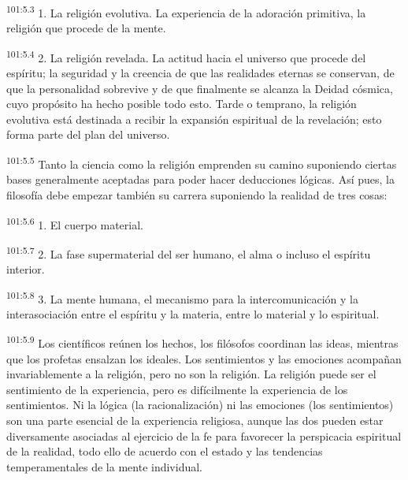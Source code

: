 \documentclass[twoside, 11pt]{book}
\begin{document}
\par
\textsuperscript{101:5.3} 1. La religión evolutiva. La experiencia de la adoración primitiva, la religión que procede de la mente.

\par
\textsuperscript{101:5.4} 2. La religión revelada. La actitud hacia el universo que procede del espíritu; la seguridad y la creencia de que las realidades eternas se conservan, de que la personalidad sobrevive y de que finalmente se alcanza la Deidad cósmica, cuyo propósito ha hecho posible todo esto. Tarde o temprano, la religión evolutiva está destinada a recibir la expansión espiritual de la revelación; esto forma parte del plan del universo.

\par
\textsuperscript{101:5.5} Tanto la ciencia como la religión emprenden su camino suponiendo ciertas bases generalmente aceptadas para poder hacer deducciones lógicas. Así pues, la filosofía debe empezar también su carrera suponiendo la realidad de tres cosas:

\par
\textsuperscript{101:5.6} 1. El cuerpo material.

\par
\textsuperscript{101:5.7} 2. La fase supermaterial del ser humano, el alma o incluso el espíritu interior.

\par
\textsuperscript{101:5.8} 3. La mente humana, el mecanismo para la intercomunicación y la interasociación entre el espíritu y la materia, entre lo material y lo espiritual.

\par
\textsuperscript{101:5.9} Los científicos reúnen los hechos, los filósofos coordinan las ideas, mientras que los profetas ensalzan los ideales. Los sentimientos y las emociones acompañan invariablemente a la religión, pero no son la religión. La religión puede ser el sentimiento de la experiencia, pero es difícilmente la experiencia de los sentimientos. Ni la lógica (la racionalización) ni las emociones (los sentimientos) son una parte esencial de la experiencia religiosa, aunque las dos pueden estar diversamente asociadas al ejercicio de la fe para favorecer la perspicacia espiritual de la realidad, todo ello de acuerdo con el estado y las tendencias temperamentales de la mente individual.
\end{document}
